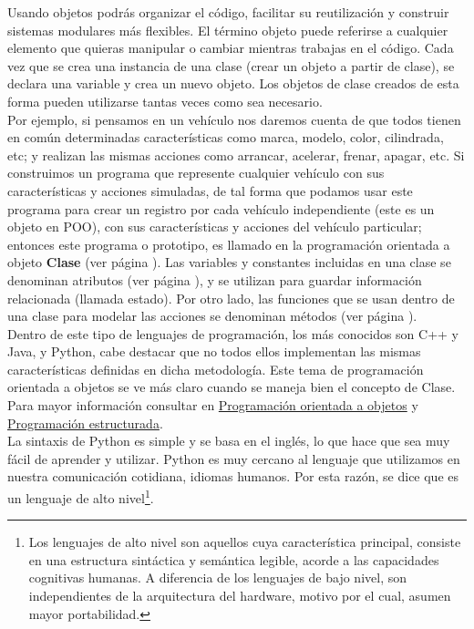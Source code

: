 Usando  objetos podrás organizar el código, facilitar su reutilización y construir sistemas modulares más flexibles. El término objeto puede referirse a cualquier elemento que quieras manipular o cambiar mientras trabajas en el código. Cada vez que se crea una instancia de una clase (crear un objeto a partir de clase), se declara una variable y crea un nuevo objeto. Los objetos de clase creados de esta forma pueden utilizarse tantas veces como sea necesario.\\


Por ejemplo, si pensamos en un vehículo nos daremos cuenta de que todos tienen en común determinadas características como marca, modelo, color, cilindrada, etc; y realizan las mismas acciones como arrancar, acelerar, frenar, apagar, etc. Si construimos un programa que represente cualquier vehículo con sus características y acciones simuladas, de tal forma que podamos usar este programa para crear un registro por cada vehículo independiente (este es un objeto en POO),  con sus características y acciones del vehículo particular; entonces este programa o prototipo, es llamado en la programación orientada a objeto {\bf Clase} (ver página \pageref{clase}). Las variables y constantes incluidas en una clase se denominan atributos (ver página \pageref{atributos}), y se utilizan para guardar información relacionada (llamada estado). Por otro lado, las funciones que se usan dentro de una clase para modelar las acciones se denominan métodos (ver página \pageref{metodo}). \\




Dentro de este tipo de lenguajes de programación, los más conocidos son C++ y Java, y Python, cabe destacar que no todos ellos implementan las mismas características definidas en dicha metodología.  Este tema de programación orientada a objetos se ve más claro cuando se maneja bien el concepto de Clase. Para mayor información consultar en \href{https://lenguajejs.com/javascript/oop/que-es/}{\color{vino}  Programación orientada a objetos}  y \href{https://es.wikipedia.org/wiki/Programaci%C3%B3n_estructurada}{\color{vino}  Programación estructurada}.\\



 
La sintaxis de Python es simple y se basa en el inglés, lo que hace que sea muy fácil de aprender y utilizar. Python es muy cercano al lenguaje que utilizamos en nuestra comunicación cotidiana, idiomas humanos. Por esta razón, se dice que es un lenguaje de alto nivel\footnote{\scriptsize{Los lenguajes de alto nivel son aquellos cuya característica principal, consiste en una estructura sintáctica y semántica legible, acorde a las capacidades cognitivas humanas. A diferencia de los lenguajes de bajo nivel, son independientes de la arquitectura del hardware, motivo por el cual, asumen mayor portabilidad.}}.\\

